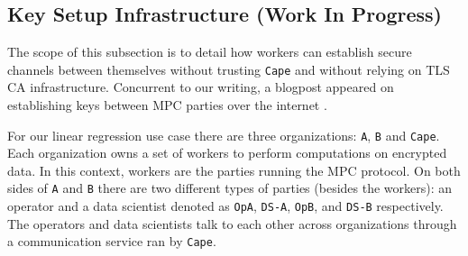 \subsection{Key Setup Infrastructure (Work In Progress)}
\label{sec:infrastructure}

The scope of this subsection is to detail how workers can establish secure channels between themselves without trusting \verb|Cape| and without relying on TLS CA infrastructure. Concurrent to our writing, a blogpost appeared on establishing keys between MPC parties over the internet \cite{url-zengo}.

For our linear regression use case there are three organizations: \verb|A|,
\verb|B| and \verb|Cape|.  Each organization owns a set of workers to perform
computations on encrypted data.  In this context, workers are the parties
running the MPC protocol.  On both sides of \verb|A| and \verb|B| there are
two different types of parties (besides the workers): an operator and a data
scientist denoted as \verb|OpA|, \verb|DS-A|, \verb|OpB|, and \verb|DS-B| respectively.  The
operators and data scientists talk to each other across organizations through
a communication service ran by \verb|Cape|.

